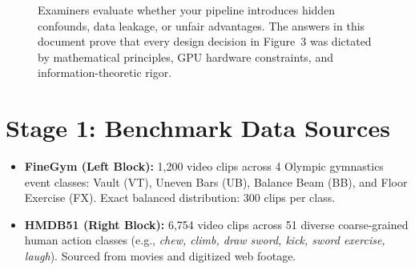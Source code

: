 \documentclass[a4paper, 11pt]{article}
\begin{document}
\begin{figure}[h!]
\centering
\begin{tcolorbox}[colback=yellow!5!white, colframe=orange!80!black, arc=2mm, title=\textbf{Defense Key Takeaway}]
Examiners evaluate whether your pipeline introduces hidden confounds, data leakage, or unfair advantages. The answers in this document prove that every design decision in Figure~3 was dictated by mathematical principles, GPU hardware constraints, and information-theoretic rigor.
\end{tcolorbox}
\end{figure}

\section{Stage 1: Benchmark Data Sources}

\begin{techbox}
\begin{itemize}
    \item \textbf{FineGym (Left Block):} 1,200 video clips across 4 Olympic gymnastics event classes: Vault (VT), Uneven Bars (UB), Balance Beam (BB), and Floor Exercise (FX). Exact balanced distribution: 300 clips per class.
    \item \textbf{HMDB51 (Right Block):} 6,754 video clips across 51 diverse coarse-grained human action classes (e.g., \textit{chew, climb, draw sword, kick, sword exercise, laugh}). Sourced from movies and digitized web footage.
\end{itemize}
\end{techbox}
\end{document}
